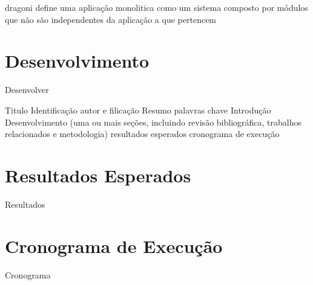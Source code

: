 \documentclass[12pt]{article}
\begin{document}
dragoni define uma aplicação monolitica como um sistema composto por módulos que não são independentes da aplicação a que pertencem



\section{Desenvolvimento} \label{sec:firstpage}

Desenvolver

Titulo
Identificação autor e filicação
Resumo
palavras chave
Introdução
Desenvolvimento (uma ou mais seções, incluindo revisão bibliográfica, trabalhos relacionados e metodologia)
resultados esperados
cronograma de execução

\section{Resultados Esperados}

Resultados

\section{Cronograma de Execução}

Cronograma





\end{document}
